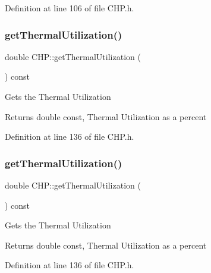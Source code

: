 Definition at line 106 of file C\+H\+P.\+h.

\mbox{\label{class_c_h_p_aa27fd9e66e208e6b3f28fdfe182d6c32}} 
\subsubsection{\texorpdfstring{get\+Thermal\+Utilization()}{getThermalUtilization()}\hspace{0.1cm}{\footnotesize\ttfamily [1/3]}}
{\footnotesize\ttfamily double C\+H\+P\+::get\+Thermal\+Utilization (\begin{DoxyParamCaption}{ }\end{DoxyParamCaption}) const\hspace{0.3cm}{\ttfamily [inline]}}

Gets the Thermal Utilization

\begin{DoxyReturn}{Returns}
double const, Thermal Utilization as a percent 
\end{DoxyReturn}


Definition at line 136 of file C\+H\+P.\+h.

\mbox{\label{class_c_h_p_aa27fd9e66e208e6b3f28fdfe182d6c32}} 
\subsubsection{\texorpdfstring{get\+Thermal\+Utilization()}{getThermalUtilization()}\hspace{0.1cm}{\footnotesize\ttfamily [2/3]}}
{\footnotesize\ttfamily double C\+H\+P\+::get\+Thermal\+Utilization (\begin{DoxyParamCaption}{ }\end{DoxyParamCaption}) const\hspace{0.3cm}{\ttfamily [inline]}}

Gets the Thermal Utilization

\begin{DoxyReturn}{Returns}
double const, Thermal Utilization as a percent 
\end{DoxyReturn}


Definition at line 136 of file C\+H\+P.\+h.

